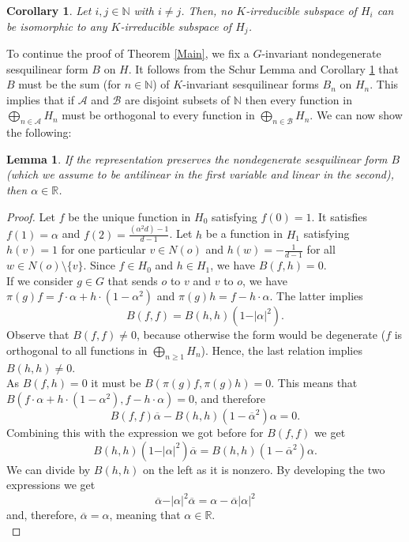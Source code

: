 \documentclass{article}
\theoremstyle{definition}
\theoremstyle{remark}
\theoremstyle{plain}
\newtheorem{lem}[dfn]{Lemma}
\newtheorem{cor}[dfn]{Corollary}
\begin{document}
\begin{cor} \label{dec}
Let $i,j\in\mathbb{N}$ with $i\neq j$. Then, no $K$-irreducible subspace of $H_i$ can be isomorphic to any $K$-irreducible subspace of $H_j$. \\
\end{cor}

To continue the proof of Theorem \ref{Main}, we fix a $G$-invariant nondegenerate sesquilinear form $B$ on $H$. It follows from the Schur Lemma and Corollary \ref{dec} that $B$ must be the sum (for $n\in\mathbb{N}$) of $K$-invariant sesquilinear forms $B_n$ on $H_n$. This implies that if $\mathcal{A}$ and $\mathcal{B}$ are disjoint subsets of $\mathbb{N}$ then every function in $\bigoplus_{n\in\mathcal{A}}{H_n}$ must be orthogonal to every function in $\bigoplus_{n\in\mathcal{B}}{H_n}$. We can now show the following:

\begin{lem} \label{alphar}
If the representation preserves the nondegenerate sesquilinear form $B$ (which we assume to be antilinear in the first variable and linear in the second), then $\alpha\in\mathbb{R}$.
\end{lem}

\begin{proof}
Let $f$ be the unique function in $H_0$ satisfying $f(0)=1$. It satisfies $f(1)=\alpha$ and $f(2)=\frac{(\alpha^2 d)-1}{d-1}$. Let $h$ be a function in $H_1$ satisfying $h(v)=1$ for one particular $v\in N(o)$ and $h(w)=-\frac{1}{d-1}$ for all $w\in N(o)\setminus\{v\}$. Since $f\in H_0$ and $h\in H_1$, we have $B(f,h)=0$. \\

If we consider $g\in G$ that sends $o$ to $v$ and $v$ to $o$, we have $\pi(g)f=f\cdot\alpha+h\cdot(1-\alpha^2)$ and $\pi(g)h=f-h\cdot\alpha$. The latter implies $$B(f,f)=B(h,h)\left(1-\vert\alpha\vert^2\right).$$ Observe that $B(f,f)\neq 0$, because otherwise the form would be degenerate ($f$ is orthogonal to all functions in $\bigoplus_{n\geq 1}{H_n}$). Hence, the last relation implies $B(h,h)\neq 0$. \\

As $B(f,h)=0$ it must be $B(\pi(g)f,\pi(g)h)=0$. This means that $B(f\cdot\alpha+h\cdot(1-\alpha^2),f-h\cdot\alpha)=0$, and therefore $$B(f,f)\overline{\alpha}-B(h,h)(1-\overline{\alpha}^2)\alpha=0.$$ Combining this with the expression we got before for $B(f,f)$ we get $$B(h,h)\left(1-\vert\alpha\vert^2\right)\overline{\alpha}=B(h,h)(1-\overline{\alpha}^2)\alpha.$$ We can divide by $B(h,h)$ on the left as it is nonzero. By developing the two expressions we get $$\overline{\alpha}-\vert\alpha\vert^2\overline{\alpha}=\alpha-\overline{\alpha}\vert\alpha\vert^2$$ and, therefore, $\overline{\alpha}=\alpha$, meaning that $\alpha\in\mathbb{R}$. \\
\end{proof}
\end{document}
